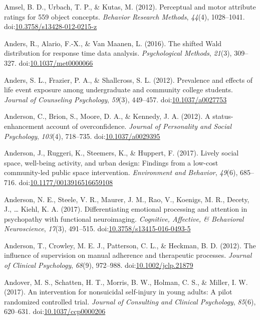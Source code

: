 \documentclass[english,man]{apa6}
\begin{document}
\hypertarget{ref-Amsel2012}{}
Amsel, B. D., Urbach, T. P., \& Kutas, M. (2012). Perceptual and motor
attribute ratings for 559 object concepts. \emph{Behavior Research
Methods}, \emph{44}(4), 1028--1041.
doi:\href{https://doi.org/10.3758/s13428-012-0215-z}{10.3758/s13428-012-0215-z}

\hypertarget{ref-Anders2016}{}
Anders, R., Alario, F.-X., \& Van Maanen, L. (2016). The shifted Wald
distribution for response time data analysis. \emph{Psychological
Methods}, \emph{21}(3), 309--327.
doi:\href{https://doi.org/10.1037/met0000066}{10.1037/met0000066}

\hypertarget{ref-Anders2012}{}
Anders, S. L., Frazier, P. A., \& Shallcross, S. L. (2012). Prevalence
and effects of life event exposure among undergraduate and community
college students. \emph{Journal of Counseling Psychology}, \emph{59}(3),
449--457. doi:\href{https://doi.org/10.1037/a0027753}{10.1037/a0027753}

\hypertarget{ref-Anderson2012a}{}
Anderson, C., Brion, S., Moore, D. A., \& Kennedy, J. A. (2012). A
status-enhancement account of overconfidence. \emph{Journal of
Personality and Social Psychology}, \emph{103}(4), 718--735.
doi:\href{https://doi.org/10.1037/a0029395}{10.1037/a0029395}

\hypertarget{ref-Anderson2017}{}
Anderson, J., Ruggeri, K., Steemers, K., \& Huppert, F. (2017). Lively
social space, well-being activity, and urban design: Findings from a
low-cost community-led public space intervention. \emph{Environment and
Behavior}, \emph{49}(6), 685--716.
doi:\href{https://doi.org/10.1177/0013916516659108}{10.1177/0013916516659108}

\hypertarget{ref-Anderson2017a}{}
Anderson, N. E., Steele, V. R., Maurer, J. M., Rao, V., Koenigs, M. R.,
Decety, J., \ldots{} Kiehl, K. A. (2017). Differentiating emotional
processing and attention in psychopathy with functional neuroimaging.
\emph{Cognitive, Affective, \& Behavioral Neuroscience}, \emph{17}(3),
491--515.
doi:\href{https://doi.org/10.3758/s13415-016-0493-5}{10.3758/s13415-016-0493-5}

\hypertarget{ref-Anderson2012}{}
Anderson, T., Crowley, M. E. J., Patterson, C. L., \& Heckman, B. D.
(2012). The influence of supervision on manual adherence and therapeutic
processes. \emph{Journal of Clinical Psychology}, \emph{68}(9),
972--988.
doi:\href{https://doi.org/10.1002/jclp.21879}{10.1002/jclp.21879}

\hypertarget{ref-Andover2017}{}
Andover, M. S., Schatten, H. T., Morris, B. W., Holman, C. S., \&
Miller, I. W. (2017). An intervention for nonsuicidal self-injury in
young adults: A pilot randomized controlled trial. \emph{Journal of
Consulting and Clinical Psychology}, \emph{85}(6), 620--631.
doi:\href{https://doi.org/10.1037/ccp0000206}{10.1037/ccp0000206}
\end{document}
